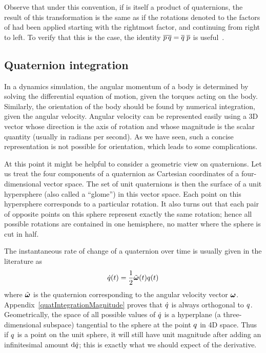 Observe that under this convention, if  is itself a product of quaternions, the
result of this transformation is the same as if the rotations denoted to the factors
of  had been applied starting with the rightmost factor, and continuing from
right to left. To verify that this is the case, the identity
$\overline{p\, q} = \overline{q}\; \overline{p}$
is useful~\cite{MathWorld:Quaternion}.

\subsection{Quaternion integration}

In a dynamics simulation, the angular momentum of a body is determined by solving the
differential equation of motion, given the torques acting on the body. Similarly, the
orientation of the body should be found by numerical integration, given the angular
velocity. Angular velocity can be represented easily using a 3D vector whose
direction is the axis of rotation and whose magnitude is the scalar quantity (usually in
radians per second). As we have seen, such a concise representation is not possible for
orientation, which leads to some complications.

At this point it might be helpful to consider a geometric view on quaternions. Let us treat
the four components of a quaternion as Cartesian coordinates of a four-dimensional vector
space. The set of unit quaternions is then the surface of a unit hypersphere (also called a
``glome''\cite{MathWorld:4D}) in this vector space. Each point on this hypersphere
corresponds to a particular rotation. It also turns out that each pair of
opposite points on this sphere represent exactly the same rotation; hence all possible
rotations are contained in one hemisphere, no matter where the sphere is cut in half.

The instantaneous rate of change of a quaternion  over time is usually given
in the literature as
\begin{equation}
\label{quatRateOfChange}
\dot{\q{q}}(t) = \frac{1}{2}\tilde{\ve{\omega}}(t)\q{q}(t)
\end{equation}
where $\tilde{\ve{\omega}}$ is the quaternion corresponding to the angular velocity
vector $\ve{\omega}$. Appendix~\ref{quatIntegrationMagnitude} proves that $\dot{q}$ is
always orthogonal to $q$. Geometrically, the space of all possible values of $\dot{q}$ is
a hyperplane (a three-dimensional subspace) tangential to the sphere at the point $q$ in
4D space. Thus if $q$ is a point on the unit sphere, it will still have unit magnitude after
adding an infinitesimal amount $\mathrm{d}\dot{q}$; this is exactly what we should expect of the
derivative.

